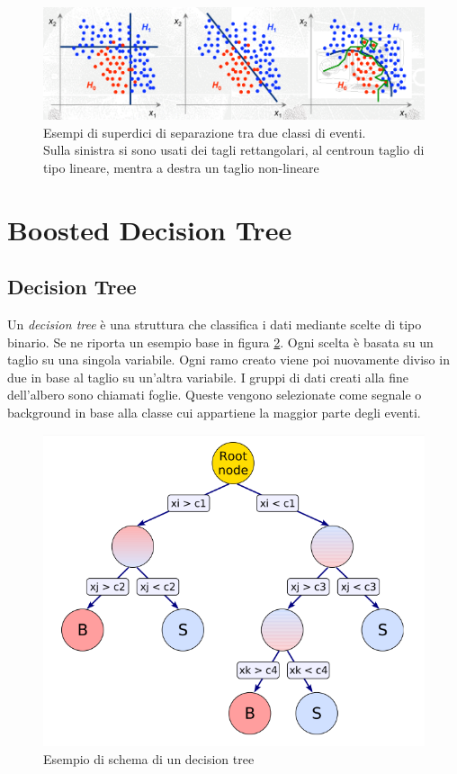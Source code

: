     \begin{figure}[htbp]
        \centering
        \includegraphics[width=0.8\linewidth]{TMVA/problemiSelezione.png}
        \caption{ Esempi di superdici di separazione tra due classi di eventi.
        \\ Sulla sinistra si sono usati dei tagli rettangolari, al centroun taglio di tipo lineare, mentra a destra un taglio non-lineare }
        \label{fig:esempiCut}
    \end{figure}
    
\section{Boosted Decision Tree}

    \subsection{Decision Tree}
    Un \textit{decision tree} è una struttura che classifica i dati mediante scelte di tipo binario. Se ne riporta un esempio base in figura \ref{fig:BDT}. Ogni scelta è basata su un taglio su una singola variabile.%
    Ogni ramo creato viene poi nuovamente diviso in due in base al taglio su un'altra variabile. I gruppi di dati creati alla fine dell'albero sono chiamati foglie. Queste vengono selezionate come segnale o background in base alla classe cui appartiene la maggior parte degli eventi. 
    
    \begin{figure}[htbp]
        \centering
        \includegraphics[width=0.5\linewidth]{TMVA/BDT1.PNG}
        \caption{ Esempio di schema di un decision tree}
        \label{fig:BDT}
    \end{figure}
    

